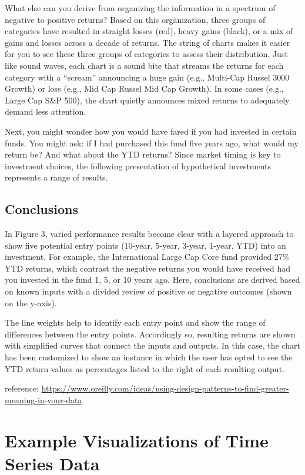 \documentclass[]{book}
\theoremstyle{definition}
\theoremstyle{definition}
\theoremstyle{definition}
\theoremstyle{remark}
\begin{document}
What else can you derive from organizing the information in a spectrum
of negative to positive returns? Based on this organization, three
groups of categories have resulted in straight losses (red), heavy gains
(black), or a mix of gains and losses across a decade of returns. The
string of charts makes it easier for you to see these three groups of
categories to assess their distribution. Just like sound waves, each
chart is a sound bite that streams the returns for each category with a
``scream'' announcing a huge gain (e.g., Multi-Cap Russel 3000 Growth)
or loss (e.g., Mid Cap Russel Mid Cap Growth). In some cases (e.g.,
Large Cap S\&P 500), the chart quietly announces mixed returns to
adequately demand less attention.

Next, you might wonder how you would have fared if you had invested in
certain funds. You might ask: if I had purchased this fund five years
ago, what would my return be? And what about the YTD returns? Since
market timing is key to investment choices, the following presentation
of hypothetical investments represents a range of results.

\subsection{Conclusions}\label{conclusions}

In Figure 3, varied performance results become clear with a layered
approach to show five potential entry points (10-year, 5-year, 3-year,
1-year, YTD) into an investment. For example, the International Large
Cap Core fund provided 27\% YTD returns, which contrast the negative
returns you would have received had you invested in the fund 1, 5, or 10
years ago. Here, conclusions are derived based on known inputs with a
divided review of positive or negative outcomes (shown on the y-axis).

The line weights help to identify each entry point and show the range of
differences between the entry points. Accordingly so, resulting returns
are shown with simplified curves that connect the inputs and outputs. In
this case, the chart has been customized to show an instance in which
the user has opted to see the YTD return values as percentages listed to
the right of each resulting output.

reference:
\url{https://www.oreilly.com/ideas/using-design-patterns-to-find-greater-meaning-in-your-data}

\section{Example Visualizations of Time Series
Data}\label{example-visualizations-of-time-series-data}
\end{document}
